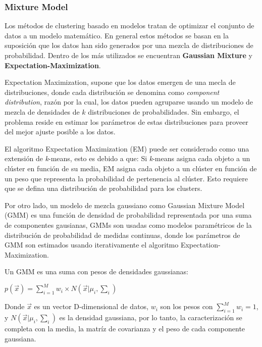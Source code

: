 \subsubsection{Mixture Model}

Los métodos de clustering basado en modelos tratan de optimizar el conjunto de datos a un modelo
matemático. En general estos métodos se basan en la suposición que los datos han sido generados por una mezcla de distribuciones de probabilidad. Dentro de los más utilizados se encuentran \textbf{Gaussian Mixture} y \textbf{Expectation-Maximization}.

Expectation Maximization, supone que los datos emergen de una mecla de distribuciones, donde cada distribución se denomina como \textit{component distribution}, razón por la cual, los datos pueden agruparse usando un modelo de mezcla de densidades de $k$ distribuciones de probabilidades. Sin embargo, el problema reside en estimar los parámetros de estas distribuciones para proveer del mejor ajuste posible a los datos. 

El algoritmo Expectation Maximization (EM) puede ser considerado como una extensión de \textit{k}-means, esto es debido a que: Si \textit{k}-means asigna cada objeto a un clúster en función de su media, EM asigna cada objeto a un clúster en función de un peso que representa la probabilidad de pertenencia al clúster. Esto requiere que se defina una distribución de probabilidad para los clusters.

Por otro lado, un modelo de mezcla gaussiano como Gaussian Mixture Model (GMM) es una función de densidad de probabilidad representada por una suma de componentes gausianas, GMMs son usadas como modelos paramétricos de la distribución de probabilidad de medidas continuas, donde los parámetros de GMM son estimados usando iterativamente el algoritmo Expectation-Maximization.

Un GMM es una suma con pesos de densidades gaussianas:

\begin{center}
	
	$p(\vec{x}) = \sum_{i=1}^{M} w_i \times N(\vec{x}|\mu_i, \sum_{i})$ 
\end{center}

Donde $\vec{x}$ es un vector D-dimensional de datos, $w_i$ son los pesos con $\sum_{i=1}^{M} w_i = 1$, y $N(\vec{x}|\mu_i, \sum_{i})$ es la densidad gaussiana, por lo tanto, la caracterización se completa con la media, la matríz de covarianza y el peso de cada componente gaussiana.

